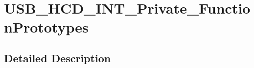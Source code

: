 \hypertarget{group___u_s_b___h_c_d___i_n_t___private___function_prototypes}{\section{U\-S\-B\-\_\-\-H\-C\-D\-\_\-\-I\-N\-T\-\_\-\-Private\-\_\-\-Function\-Prototypes}
\label{group___u_s_b___h_c_d___i_n_t___private___function_prototypes}
}


\subsection{Detailed Description}
